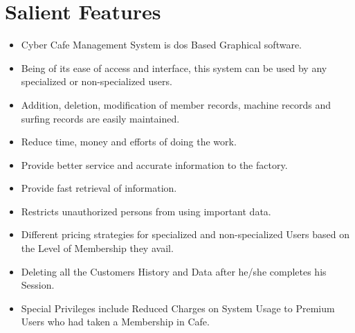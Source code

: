 \documentclass[12pt]{article}
\begin{document}
\section{Salient Features}
\vspace{5mm}
 \large \begin{itemize}
\item  Cyber Cafe Management System is dos Based Graphical software. 
\item  Being of its ease of access and interface, this system can be used by any
specialized or non-specialized users. 
\item Addition, deletion, modification of member records, machine records and surfing
records are easily maintained. 
\item  Reduce time, money and efforts of doing the work. 
\item  Provide better service and accurate information to the factory. 
\item  Provide fast retrieval of information. 
\item Restricts unauthorized persons from using important data. 
\item Different pricing strategies for specialized and non-specialized Users based on the Level of Membership they avail.
\item Deleting all the Customers History and Data after he/she completes his Session.
\item Special Privileges include Reduced Charges on System Usage to Premium Users who had taken a Membership in Cafe.
\end{itemize} \newpage
\end{document}
